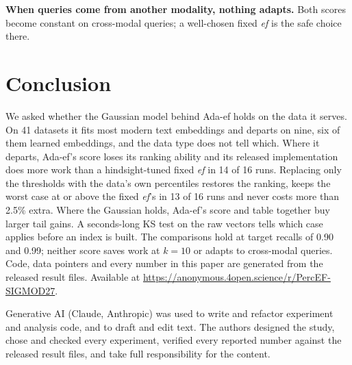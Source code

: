 \documentclass[sigconf,anonymous]{acmart}
\newcommand{\ef}{\textit{ef}}
\begin{document}
\textbf{When queries come from another modality, nothing adapts.} Both scores become constant on
cross-modal queries; a well-chosen fixed \ef{} is the safe choice there.

\section{Conclusion}

We asked whether the Gaussian model behind Ada-ef holds on the data it serves. On 41 datasets it
fits most modern text embeddings and departs on nine, six of them learned embeddings, and the data
type does not tell which. Where it departs, Ada-ef's score loses its ranking ability and its
released implementation does more work than a hindsight-tuned fixed \ef{} in 14 of 16 runs.
Replacing only the thresholds with the data's own percentiles restores the ranking, keeps the worst
case at or above the fixed \ef{}'s in 13 of 16 runs and never costs more than 2.5\% extra. Where the
Gaussian holds, Ada-ef's score and table together buy larger tail gains. A seconds-long KS test on
the raw vectors tells which case applies before an index is built. The comparisons hold at target
recalls of 0.90 and 0.99; neither score saves work at $k = 10$ or adapts to cross-modal queries.
Code, data pointers and every number in this paper are generated from the released result files.
Available at \url{https://anonymous.4open.science/r/PercEF-SIGMOD27}.

\begin{acks}
Generative AI (Claude, Anthropic) was used to write and refactor experiment and analysis code,
and to draft and edit text. The authors designed the study, chose and checked every
experiment, verified every reported number against the released result files, and take
full responsibility for the content.
\end{acks}




\end{document}
